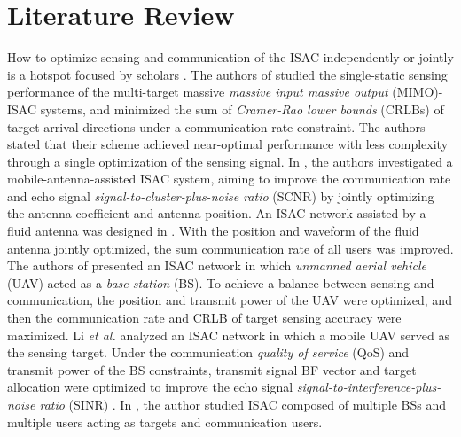 \section{Literature Review}
How to optimize sensing and communication of the ISAC independently or jointly is a hotspot focused by scholars \cite{ISAC_PLS_15_r,ISAC_PLS_16_r,ISAC_PLS_7}. The authors of \cite{ISAC_PLS_30} studied the single-static sensing performance of the multi-target massive \emph{massive input massive output} (MIMO)-ISAC systems, and minimized the sum of \emph{Cramer-Rao lower bounds} (CRLBs) of target arrival directions under a communication rate constraint. The authors stated that their scheme achieved near-optimal
performance with less complexity through a single optimization of the sensing signal.
In \cite{ISAC_PLS_19}, the authors investigated a mobile-antenna-assisted ISAC system, aiming to improve the communication rate and echo signal \emph{signal-to-cluster-plus-noise ratio} (SCNR) by jointly optimizing the antenna coefficient and antenna position. An ISAC network assisted by a fluid antenna was designed in \cite{ISAC_PLS_24}. With the position and waveform of the fluid antenna jointly optimized, the sum communication rate of all users was improved. The authors of \cite{ISAC_PLS_20} presented an ISAC network in which \emph{unmanned aerial vehicle} (UAV) acted as a \emph{base station} (BS). To achieve a balance between sensing and communication, the position and transmit power of the UAV were optimized, and then the communication rate and CRLB of target sensing accuracy were maximized. %
Li \emph{et al.} analyzed an ISAC network in which a mobile UAV served as the sensing target. Under the communication \emph{quality of service} (QoS) and transmit power of the BS constraints, transmit signal BF vector and target allocation were optimized to improve the echo signal \emph{signal-to-interference-plus-noise ratio} (SINR) \cite{ISAC_PLS_23}. In \cite{ISAC_PLS_21}, the author studied ISAC composed of multiple BSs and multiple users acting as targets and communication users. %

